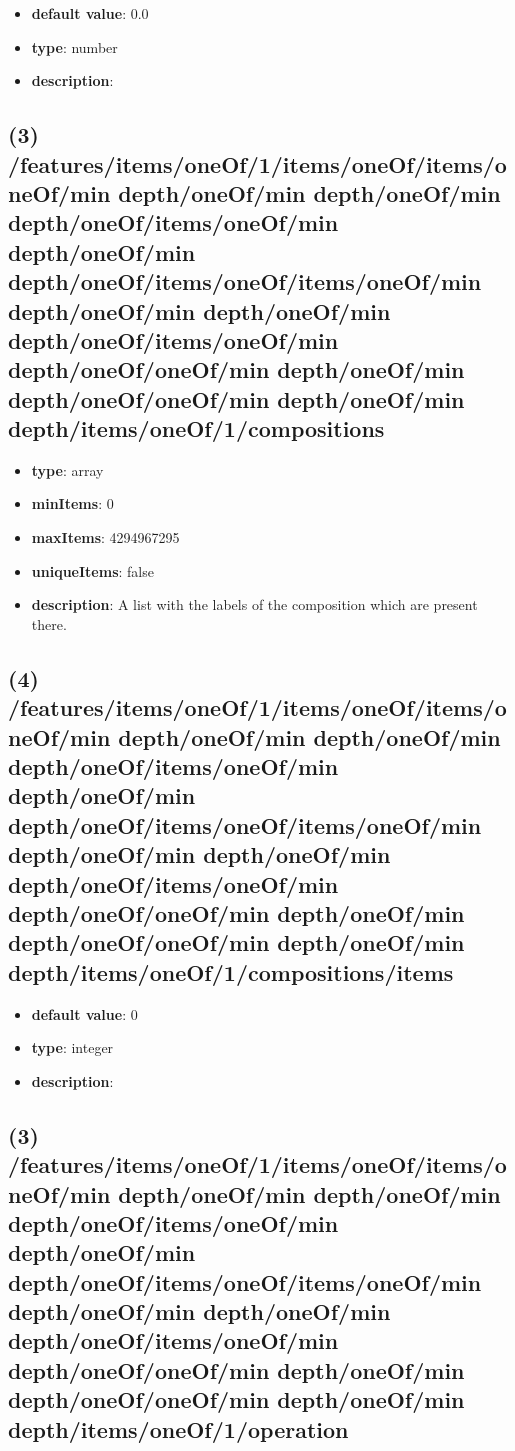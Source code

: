 \begin{itemize}[leftmargin=4em]\item {\bf default value}: 0.0
\item {\bf type}: number
\item {\bf description}: 
\end{itemize}\subsection{(3) /features/items/oneOf/1/items/oneOf/items/oneOf/min depth/oneOf/min depth/oneOf/min depth/oneOf/items/oneOf/min depth/oneOf/min depth/oneOf/items/oneOf/items/oneOf/min depth/oneOf/min depth/oneOf/min depth/oneOf/items/oneOf/min depth/oneOf/oneOf/min depth/oneOf/min depth/oneOf/oneOf/min depth/oneOf/min depth/items/oneOf/1/compositions}
\begin{itemize}[leftmargin=3em]\item {\bf type}: array
\item {\bf minItems}: 0
\item {\bf maxItems}: 4294967295
\item {\bf uniqueItems}: false
\item {\bf description}: A list with the labels of the composition which are present there.
\end{itemize}\subsection{(4) /features/items/oneOf/1/items/oneOf/items/oneOf/min depth/oneOf/min depth/oneOf/min depth/oneOf/items/oneOf/min depth/oneOf/min depth/oneOf/items/oneOf/items/oneOf/min depth/oneOf/min depth/oneOf/min depth/oneOf/items/oneOf/min depth/oneOf/oneOf/min depth/oneOf/min depth/oneOf/oneOf/min depth/oneOf/min depth/items/oneOf/1/compositions/items}
\begin{itemize}[leftmargin=4em]\item {\bf default value}: 0
\item {\bf type}: integer
\item {\bf description}: 
\end{itemize}\subsection{(3) /features/items/oneOf/1/items/oneOf/items/oneOf/min depth/oneOf/min depth/oneOf/min depth/oneOf/items/oneOf/min depth/oneOf/min depth/oneOf/items/oneOf/items/oneOf/min depth/oneOf/min depth/oneOf/min depth/oneOf/items/oneOf/min depth/oneOf/oneOf/min depth/oneOf/min depth/oneOf/oneOf/min depth/oneOf/min depth/items/oneOf/1/operation}
